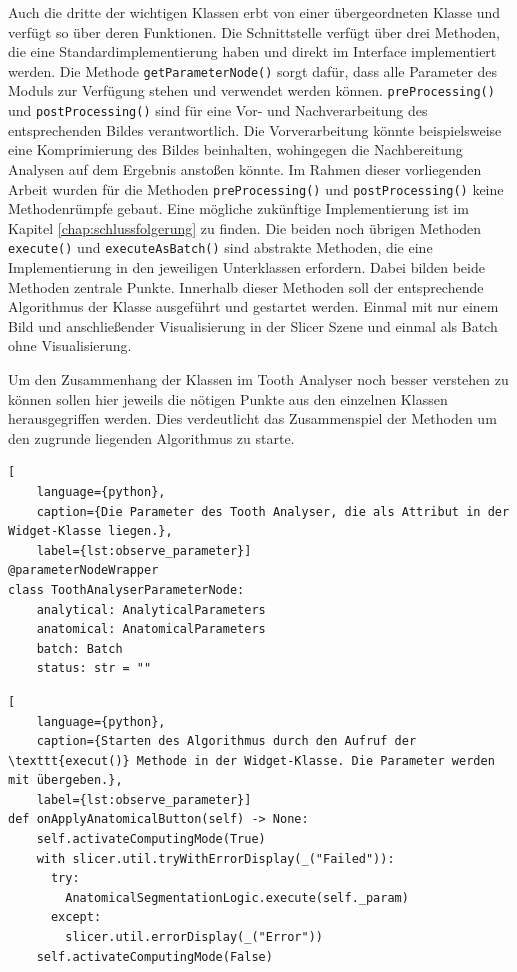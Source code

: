 Auch die dritte der wichtigen Klassen erbt von einer übergeordneten Klasse und
verfügt so über deren Funktionen. Die Schnittstelle verfügt über drei Methoden,
die eine Standardimplementierung haben und direkt im Interface implementiert
werden. Die Methode \texttt{getParameterNode()} sorgt dafür, dass alle Parameter
des Moduls zur Verfügung stehen und verwendet werden können. \texttt{preProcessing()}
und \texttt{postProcessing()} sind für eine Vor- und Nachverarbeitung des entsprechenden
Bildes verantwortlich. Die Vorverarbeitung könnte beispielsweise eine
Komprimierung des Bildes beinhalten, wohingegen die Nachbereitung Analysen auf dem
Ergebnis anstoßen könnte. Im Rahmen dieser vorliegenden Arbeit wurden für die
Methoden \texttt{preProcessing()} und \texttt{postProcessing()} keine
Methodenrümpfe gebaut. Eine mögliche zukünftige Implementierung ist im Kapitel \ref{chap:schlussfolgerung}
zu finden. Die beiden noch übrigen Methoden \texttt{execute()} und \texttt{executeAsBatch()}
sind abstrakte Methoden, die eine Implementierung in den jeweiligen Unterklassen
erfordern. Dabei bilden beide Methoden zentrale Punkte. Innerhalb dieser Methoden
soll der entsprechende Algorithmus der Klasse ausgeführt und gestartet werden.
Einmal mit nur einem Bild und anschließender Visualisierung in der Slicer Szene
und einmal als Batch ohne Visualisierung.

\pagebreak

Um den Zusammenhang der Klassen im Tooth Analyser noch besser verstehen zu können
sollen hier jeweils die nötigen Punkte aus den einzelnen Klassen herausgegriffen
werden. Dies verdeutlicht das Zusammenspiel der Methoden um den zugrunde
liegenden Algorithmus zu starte.

\begin{lstlisting}[
    language={python},
    caption={Die Parameter des Tooth Analyser, die als Attribut in der Widget-Klasse liegen.},
    label={lst:observe_parameter}]
@parameterNodeWrapper
class ToothAnalyserParameterNode:
    analytical: AnalyticalParameters
    anatomical: AnatomicalParameters
    batch: Batch
    status: str = ""
\end{lstlisting}

\begin{lstlisting}[
    language={python},
    caption={Starten des Algorithmus durch den Aufruf der \texttt{execut()} Methode in der Widget-Klasse. Die Parameter werden mit übergeben.},
    label={lst:observe_parameter}]
def onApplyAnatomicalButton(self) -> None:
    self.activateComputingMode(True)
    with slicer.util.tryWithErrorDisplay(_("Failed")):
	  try:
	    AnatomicalSegmentationLogic.execute(self._param)
	  except:
	    slicer.util.errorDisplay(_("Error"))
    self.activateComputingMode(False)
\end{lstlisting}

